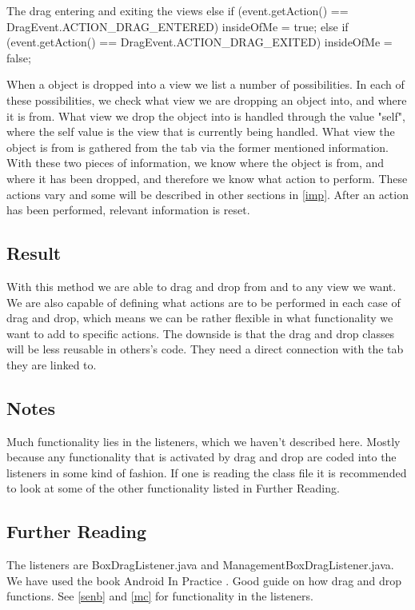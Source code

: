 \begin{source}[{elseif}]{The drag entering and exiting the views}
else if (event.getAction() == DragEvent.ACTION_DRAG_ENTERED){ 
			insideOfMe = true;
			} 
else if (event.getAction() == DragEvent.ACTION_DRAG_EXITED){
			insideOfMe = false;
			}
\end{source}
When a object is dropped into a view we list a number of possibilities. 
In each of these possibilities, we check what view we are dropping an object into, and where it is from. What view we drop the object into is handled through the value "self", where the self value is the view that is currently being handled. 
What view the object is from is gathered from the tab via the former mentioned information. 
With these two pieces of information, we know where the object is from, and where it has been dropped, and therefore we know what action to perform. 
These actions vary and some will be described in other sections in \autoref{imp}. 
After an action has been performed, relevant information is reset.

\subsection*{Result}
With this method we are able to drag and drop from and to any view we want. 
We are also capable of defining what actions are to be performed in each case of drag and drop, which means we can be rather flexible in what functionality we want to add to specific actions. 
The downside is that the drag and drop classes will be less reusable in others's code. 
They need a direct connection with the tab they are linked to.


\subsection*{Notes}
Much functionality lies in the listeners, which we haven't described here. Mostly because any functionality that is activated by drag and drop are coded into the listeners in some kind of fashion. If one is reading the class file it is recommended to look at some of the other functionality listed in Further Reading.


\subsection*{Further Reading}
The listeners are BoxDragListener.java and ManagementBoxDragListener.java. 
We have used the book Android In Practice \cite{aip}. Good guide on how drag and drop functions.\newline
See \autoref{senb} and \autoref{mc} for functionality in the listeners.